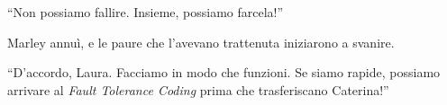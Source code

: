 \begin{center}
\begin{minipage}{0.6\textwidth}
    \centering
\end{minipage}
\end{center}


\begin{dialogue}
 \enquote{Non possiamo fallire. Insieme, possiamo farcela!}
\end{dialogue}

Marley annuì, e le paure che l'avevano trattenuta iniziarono a svanire.

\begin{dialogue}
 \enquote{D'accordo, Laura. Facciamo in modo che funzioni. Se siamo rapide, possiamo arrivare al \textit{Fault Tolerance Coding} prima che trasferiscano Caterina!}
\end{dialogue}

